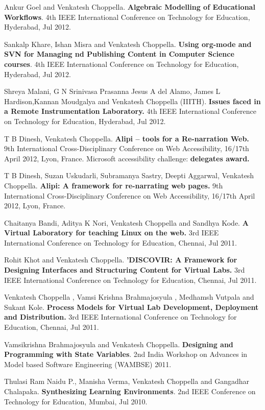 \documentclass[11pt,margin,line]{res}
\begin{document}
\begin{resume}
Ankur Goel and Venkatesh Choppella.  {\bf Algebraic
  Modelling of Educational Workflows}.  4th IEEE
International Conference on Technology for Education,
Hyderabad, Jul 2012.

Sankalp Khare, Ishan Misra and Venkatesh Choppella.  {\bf
  Using org-mode and SVN for Managing nd Publishing Content
  in Computer Science courses}.
4th IEEE International Conference on Technology for
Education, Hyderabad, Jul 2012.

Shreya Malani, G N Srinivasa Prasanna Jesus A del Alamo,
James L Hardison,Kannan Moudgalya and Venkatesh Choppella
(IIITH). {\bf Issues faced in a Remote Instrumentation
  Laboratory.}  4th IEEE International Conference on
Technology for Education, Hyderabad, Jul 2012.

T B Dinesh, Venkatesh Choppella.  {\bf Alipi -- tools for a
  Re-narration Web.}  9th International Cross-Disciplinary
Conference on Web Accessibility, 16/17th April 2012, Lyon,
France.  Microsoft accessibility challenge: {\bf delegates
  award.}

T B Dinesh, Suzan Uskudarli, Subramanya Sastry, Deepti
Aggarwal, Venkatesh Choppella.  {\bf Alipi: A framework for
  re-narrating web pages.}  9th International
Cross-Disciplinary Conference on Web Accessibility, 16/17th
April 2012, Lyon, France.

Chaitanya Bandi, Aditya K Nori, Venkatesh Choppella and
Sandhya Kode. {\bf A Virtual Laboratory for teaching Linux
  on the web.}  3rd IEEE International Conference on
Technology for Education, Chennai, Jul 2011.

Rohit Khot and Venkatesh Choppella.  {\bf 'DISCOVIR: A
  Framework for Designing Interfaces and Structuring Content
  for Virtual Labs.}  3rd IEEE International Conference on
Technology for Education, Chennai, Jul 2011.

Venkatesh Choppella , Vamsi Krishna Brahmajosyula , Medhamsh
Vutpala and Sukant Kole.  {\bf Process Models for Virtual
  Lab Development, Deployment and Distribution.} 3rd IEEE
International Conference on Technology for Education,
Chennai, Jul 2011.

Vamsikrishna Brahmajosyula and Venkatesh Choppella.  {\bf
  Designing and Programming with State Variables}.  2nd
India Workshop on Advances in Model based Software
Engineering (WAMBSE) 2011.

Thulasi Ram Naidu P., Manisha Verma, Venkatesh Choppella and
Gangadhar Chalapaka.  {\bf Synthesizing Learning
  Environments}.  2nd IEEE Conference on Technology for
Education, Mumbai, Jul 2010.


\end{resume}
\end{document}
